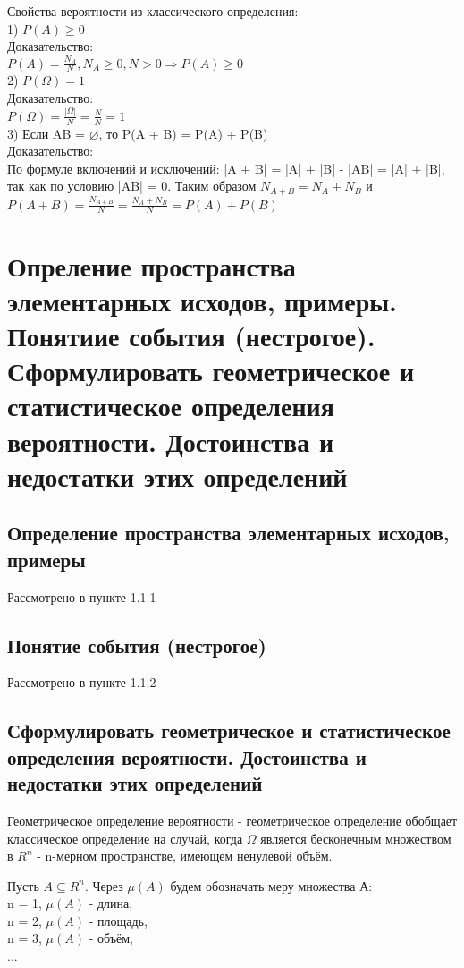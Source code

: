 Свойства вероятности из классического определения:\\
1) $P(A) \geqslant 0$\\
Доказательство:\\
$P(A) = \frac{N_{A}}{N}, N_{A} \geqslant 0, N > 0 \Rightarrow P(A) \geqslant 0$\\
2) $P(\Omega) = 1$\\
Доказательство:\\
$P(\Omega) = \frac{|\Omega|}{N} = \frac{N}{N} = 1$\\
3) Если AB = $\varnothing$, то P(A + B) = P(A) + P(B)\\
Доказательство:\\
По формуле включений и исключений: |A + B| = |A| + |B| - |AB| = |A| + |B|, так как по условию |AB| = 0. Таким образом $N_{A + B} = N_{A} + N_{B}$ и $P(A + B) = \frac{N_{A + B}}{N} = \frac{N_{A} + N_{B}}{N} = P(A) + P(B)$

\section{Опреление пространства элементарных исходов, примеры. Понятиие события (нестрогое). Сформулировать геометрическое и статистическое определения вероятности. Достоинства и недостатки этих определений}

\subsection{Определение пространства элементарных исходов, примеры}
Рассмотрено в пункте 1.1.1

\subsection{Понятие события (нестрогое)}
Рассмотрено в пункте 1.1.2

\subsection{Сформулировать геометрическое и статистическое определения вероятности. Достоинства и недостатки этих определений}

Геометрическое определение вероятности - геометрическое определение обобщает классическое определение на случай, когда $\Omega$ является бесконечным множеством в $R^{n}$ - n-мерном пространстве, имеющем ненулевой объём.

Пусть $A \subseteq R^{n}$. Через $\mu(A)$ будем обозначать меру множества А:\\
n = 1, $\mu(A)$ - длина,\\
n = 2, $\mu(A)$ - площадь,\\
n = 3, $\mu(A)$ - объём,\\
...\\


